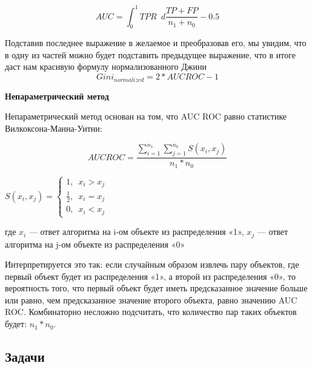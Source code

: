 $$AUC = \int_{0}^{1} TPR \enspace d\frac{TP + FP}{n_1+n_0} - 0.5 $$



Подставив последнее выражение в желаемое и преобразовав его, мы увидим, что в одну из частей можно будет подставить предыдущее выражение, что в итоге даст нам красивую формулу нормализованного Джини
$$Gini_{normalized} = 2 * AUCROC - 1$$

{\bf Непараметрический метод}

Непараметрический метод основан на том, что AUC ROC равно статистике Вилкоксона-Манна-Уитни:

$$AUCROC = \frac{\sum_{i=1}^{n_1} \sum_{j=1}^{n_0} S(x_i, x_j)}{n_1*n_0} $$


\begin{center}
    $S(x_i, x_j) = \begin{cases} 1, \enspace x_i > x_j\\ \frac{1}{2}, \enspace x_i = x_j \\ 0,\enspace x_i < x_j \end{cases}$
\end{center}


где $x_i$ — ответ алгоритма на i-ом объекте из распределения «1», $x_j$ — ответ алгоритма на j-ом объекте из распределения «0»

Интерпретируется это так: если случайным образом извлечь пару объектов, где первый объект будет из распределения «1», а второй из распределения «0», то вероятность того, что первый объект будет иметь предсказанное значение больше или равно, чем предсказанное значение второго объекта, равно значению AUC ROC. Комбинаторно несложно подсчитать, что количество пар таких объектов будет: $n_1*n_0$.


\subsection*{Задачи}

